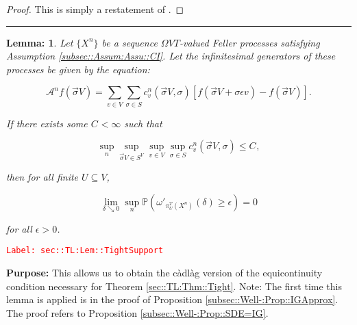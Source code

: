 \documentclass[12pt]{article}
\newcommand{\mb}{\mathbb}
\newcommand{\mc}{\mathcal}
\newcommand{\ep}{\epsilon}
\newcommand{\tr}{\textcolor{red}}
\newcommand{\labe}[1]{\tr{\texttt{Label: #1}}}
\newcommand{\purpose}{\textbf{Purpose: }}
\newcommand{\lin}{\rule{\linewidth}{0.4 pt}}
\newcommand{\pr}{\mb{P}}							%
\renewcommand{\v}{v}							%
\renewcommand{\U}{U}							%
\renewcommand{\S}{S}							%
\newcommand{\s}{\sigma}							%
\newcommand{\sv}{\vec{\s}}						%
\newcommand{\ev}{\ep}							%
\newcommand{\T}{T}								%
\newcommand{\IG}{\mc{A}}						%
\newcommand{\pup}[1]{^{#1}}							%
\newcommand{\V}{V}									%
\newcommand{\numb}{n}								%
\newcommand{\XState}[1]{\S^{#1}}				%
\newcommand{\piV}[2]{\pi_{#1}^{#2}}					%
\newcommand{\rxvtsn}[3]{X_{#1}^{#3}{#2}}			%
\newcommand{\IGr}[1]{c_{#1}}						%
\newcommand{\const}[1]{C_{#1}}						%
\newtheorem{lem}[thms]{Lemma: }
\begin{document}
\begin{proof}
This is simply a restatement of \cite[Theorem 13.2]{Bil99}.
\end{proof}

\lin

\begin{lem}
Let \(\{\rxvtsn{}{}{\numb}\}\) be a sequence \(\Omega{\V}{\T}\)-valued Feller processes satisfying Assumption \ref{subsec::Assum:Assu::CI}. Let the infinitesimal generators of these processes be given by the equation:

\[\IG\pup{\numb}f(\sv{}{\V}) = \sum_{\v\in \V}\sum_{\s \in \S} \IGr{\v}\pup{\numb}(\sv{}{\V},\s)[f(\sv{}{\V} + \s\ev{\v}) - f(\sv{}{\V})].\]

If there exists some \(\const{} < \infty\) such that

\[\sup_{\numb}\sup_{\sv{}{\V}\in \S^\V}\sup_{\v\in\V}\sup_{\s\in \S} \IGr{\v}\pup{\numb}(\sv{}{\V},\s) \leq \const{},\]

then for all finite \(\U \subseteq \V\),

\[\lim_{\delta \searrow 0} \sup_\numb \pr\left(\omega'_{\piV{\U}{\T}\left(\rxvtsn{}{}{\numb}\right)}(\delta) \geq \ep\right) = 0\]

for all \(\ep > 0\).
\label{sec::TL:Lem::TightSupport}
\end{lem}
\labe{sec::TL:Lem::TightSupport}

\purpose This allows us to obtain the c\`adl\`ag version of the equicontinuity condition necessary for Theorem \ref{sec::TL:Thm::Tight}. Note: The first time this lemma is applied is in the proof of Proposition \ref{subsec::Well-:Prop::IGApprox}. The proof refers to Proposition \ref{subsec::Well-:Prop::SDE=IG}.
\end{document}

